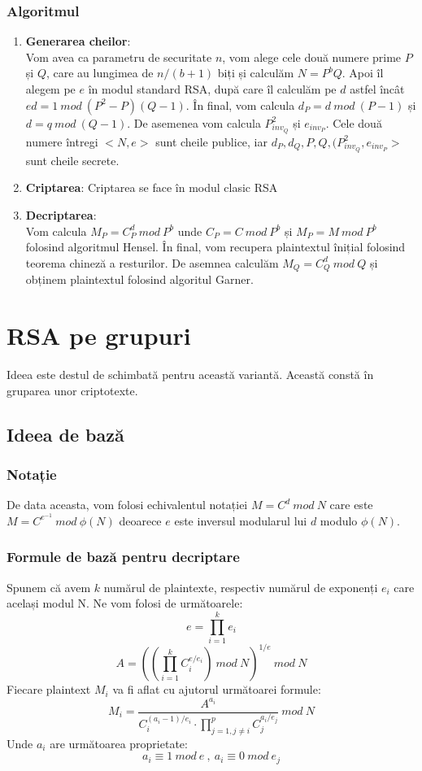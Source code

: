 \documentclass[12]{report}
\begin{document}
		  \subsubsection{Algoritmul}
		  \begin{enumerate}
		  \item \textbf{Generarea cheilor}:\\
		  Vom avea ca parametru de securitate $n$, vom alege cele două numere prime $P$ și $Q$, care au lungimea de $n/(b+1)$ biți și calculăm $N=P^bQ$. Apoi îl alegem pe $e$ în modul standard RSA, după care îl calculăm pe $d$ astfel încât $ed=1 \ mod \ (P^2-P)(Q-1)$. În final, vom calcula $d_P= d \ mod \ (P-1)$ și $d=q \ mod \ (Q-1)$. De asemenea vom calcula $P_{inv_Q}^{2}$ și $e_{inv_P}$. Cele două numere întregi $<N,e>$ sunt cheile publice, iar $d_P,d_Q,P,Q,(P_{inv_Q}^{2},e_{inv_P}>$ sunt cheile secrete.
		  \item \textbf{Criptarea}:
		  Criptarea se face în modul clasic RSA
		  
		  \item \textbf{Decriptarea}: \\
		  Vom calcula $M_P = C_{P}^{d} \ mod \ P^b $ unde $C_P = C \ mod \ P^b$ și  $M_P = M \ mod \ P^b$ folosind algoritmul Hensel. În final, vom recupera plaintextul înițial folosind teorema chineză a resturilor. De asemnea calculăm $M_Q= C_{Q}^{d} \ mod \ Q$ și obținem plaintextul folosind algoritul Garner.
		  \end{enumerate}
		  
		  \section{RSA pe grupuri}
		  Ideea este destul de schimbată pentru această variantă. Această constă în gruparea unor criptotexte.
		  \subsection{Ideea de bază}
		  \subsubsection{Notație}
		  De data aceasta, vom folosi echivalentul notației $M=C^d \ mod \ N$ care este $M=C^{e^{
		  -1}} \ mod \ \phi(N)$ deoarece $e$ este inversul modularul lui $d$ modulo $\phi(N)$.
		  
		  \subsubsection{Formule de bază pentru decriptare}
		  Spunem că avem $k$ numărul de plaintexte, respectiv numărul de exponenți $e_i$ care același modul N. Ne vom folosi de următoarele:
		  $$ e= \prod_{i=1}^{k}e_i$$
		  $$ A =\left( \left(\prod_{i=1}^{k} C_{i}^{e/e_i} \right) \ mod \ N \right)^{1/e} \ mod \ N$$
		  Fiecare plaintext $M_i$ va fi aflat cu ajutorul următoarei formule:
		  $$ M_i = \frac{A^{a_i}}{C_{i}^{(a_i-1)/e_i} \cdot   \prod_{j=1,j \neq i }^{p } C_{j}^{a_i/e_j }                                 } \ mod \ N$$ 	
		  Unde $a_i$ are următoarea proprietate:
		  $$a_i \equiv 1 \ mod \ e \ , \ a_i \equiv 0 \ mod \ e_j$$	  
		  
\end{document}
